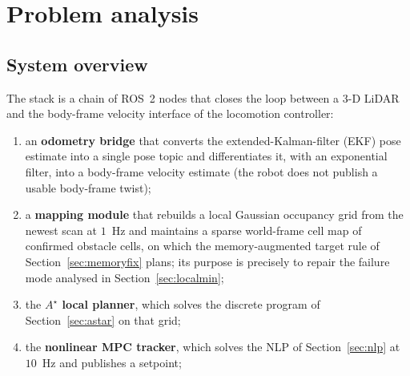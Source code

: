 \documentclass[11pt,a4paper]{article}
\newcommand{\astar}{$A^\star$}
\begin{document}

\section{Problem analysis}
\label{sec:problem}

\subsection{System overview}
\label{sec:overview}

The stack is a chain of ROS~2 nodes that closes the loop between a 3-D LiDAR and the
body-frame velocity interface of the locomotion controller:

\begin{enumerate}[label=\arabic*.]
  \item an \textbf{odometry bridge} that converts the extended-Kalman-filter (EKF) pose estimate into a
        single pose topic and differentiates it, with an exponential filter, into a body-frame velocity estimate (the robot does
        not publish a usable body-frame twist);
  \item a \textbf{mapping module} that rebuilds a local Gaussian occupancy grid from the newest scan at
        $1$~Hz and maintains a sparse world-frame cell map of confirmed obstacle cells, on which the memory-augmented target rule of Section~\ref{sec:memoryfix} plans; its purpose
        is precisely to repair the failure mode analysed in Section~\ref{sec:localmin};
  \item the \textbf{\astar{} local planner}, which solves the discrete program of
        Section~\ref{sec:astar} on that grid;
  \item the \textbf{nonlinear MPC tracker}, which solves the NLP of Section~\ref{sec:nlp} at $10$~Hz and
        publishes a setpoint;
\end{enumerate}

\end{document}

